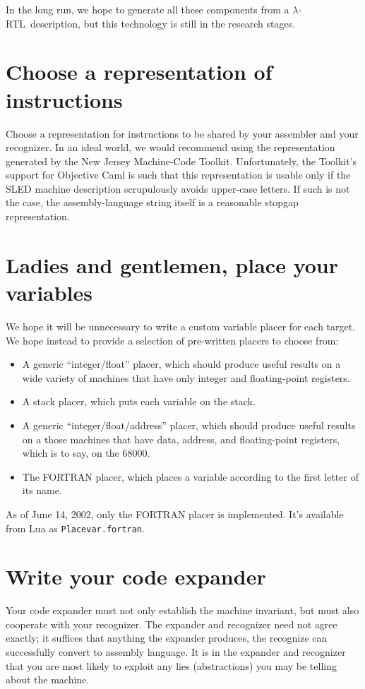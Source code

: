 \documentclass[12pt]{article}
\newcommand\lrtl{\mbox{$\lambda$-RTL}}
\begin{document}
In the long run,
we hope to generate all these components from a \lrtl\ description,
but this technology is still in the research stages.

\section{Choose a representation of instructions}

Choose a representation for instructions to be shared by your
assembler and your recognizer.
In an ideal world, 
we would recommend using the representation generated by the New Jersey
Machine-Code Toolkit. 
Unfortunately, the Toolkit's support for Objective Caml is such that
this representation is usable only if the SLED machine description
scrupulously avoids upper-case letters.
If such is not the case, the assembly-language string itself is a
reasonable stopgap representation.

\section{Ladies and gentlemen, place your variables} 


We hope it will be unnecessary to write a custom variable placer for
each target.
We hope instead to provide a selection of pre-written placers to
choose from:
\begin{itemize}
\item
A generic ``integer/float'' placer, which should produce useful
results on a wide variety of machines that have only integer and
floating-point registers.
\item
A stack placer, which puts each variable on the stack.
\item
A generic ``integer/float/address'' placer, which should produce useful
results on a those machines that have data, address, and 
floating-point registers, which is to say, on the 68000.
\item
The FORTRAN placer, which places a variable according to the first
letter of its name.
\end{itemize}
As of June 14, 2002, only the FORTRAN placer is implemented.
It's available from Lua as \texttt{Placevar.fortran}.

\section{Write your code expander}

Your code expander must not only establish the machine invariant, but
must also cooperate with your recognizer.
The expander and recognizer need not agree exactly;
it suffices that anything the expander produces, the recognize can
successfully convert to assembly language.
It is in the expander and recognizer that you are most likely to
exploit any lies (abstractions) you may be telling about the machine.
\end{document}
